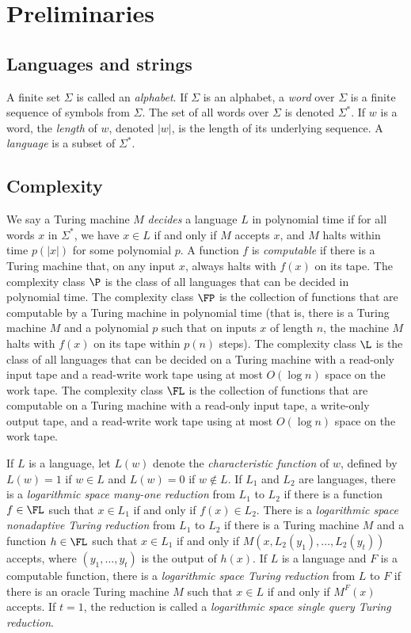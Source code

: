 \documentclass{article}
\begin{document}
\section{Preliminaries}

\subsection{Languages and strings}

A finite set $\Sigma$ is called an \emph{alphabet}.
If $\Sigma$ is an alphabet, a \emph{word} over $\Sigma$ is a finite sequence of symbols from $\Sigma$.
The set of all words over $\Sigma$ is denoted $\Sigma^*$.
If $w$ is a word, the \emph{length} of $w$, denoted $|w|$, is the length of its underlying sequence.
A \emph{language} is a subset of $\Sigma^*$.

\subsection{Complexity}

We say a Turing machine $M$ \emph{decides} a language $L$ in polynomial time if for all words $x$ in $\Sigma^*$, we have $x \in L$ if and only if $M$ accepts $x$, and $M$ halts within time $p(|x|)$ for some polynomial $p$.
A function $f$ is \emph{computable} if there is a Turing machine that, on any input $x$, always halts with $f(x)$ on its tape.
The complexity class $\P$ is the class of all languages that can be decided in polynomial time.
The complexity class $\FP$ is the collection of functions that are computable by a Turing machine in polynomial time (that is, there is a Turing machine $M$ and a polynomial $p$ such that on inputs $x$ of length $n$, the machine $M$ halts with $f(x)$ on its tape within $p(n)$ steps).
The complexity class $\L$ is the class of all languages that can be decided on a Turing machine with a read-only input tape and a read-write work tape using at most $O(\log n)$ space on the work tape.
The complexity class $\FL$ is the collection of functions that are computable on a Turing machine with a read-only input tape, a write-only output tape, and a read-write work tape using at most $O(\log n)$ space on the work tape.

If $L$ is a language, let $L(w)$ denote the \emph{characteristic function} of $w$, defined by $L(w) = 1$ if $w \in L$ and $L(w) = 0$ if $w \notin L$.
If $L_1$ and $L_2$ are languages, there is a \emph{logarithmic space many-one reduction} from $L_1$ to $L_2$ if there is a function $f \in \FL$ such that $x \in L_1$ if and only if $f(x) \in L_2$.
There is a \emph{logarithmic space nonadaptive Turing reduction} from $L_1$ to $L_2$ if there is a Turing machine $M$ and a function $h \in \FL$ such that $x \in L_1$ if and only if $M(x, L_2(y_1), \dotsc, L_2(y_t))$ accepts, where $(y_1, \dotsc, y_t)$ is the output of $h(x)$.
If $L$ is a language and $F$ is a computable function, there is a \emph{logarithmic space Turing reduction} from $L$ to $F$ if there is an oracle Turing machine $M$ such that $x \in L$ if and only if $M^F(x)$ accepts.
If $t = 1$, the reduction is called a \emph{logarithmic space single query Turing reduction}.
\end{document}
